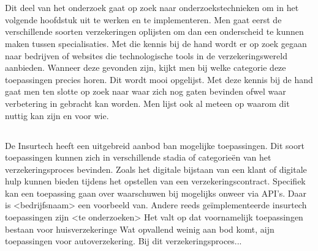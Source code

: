 
\chapter{}
\label{ch:voorbereiding-onderzoek}

\section{}
\label{sec:inleiding}

Dit deel van het onderzoek gaat op zoek naar onderzoekstechnieken om in het volgende hoofdstuk uit te werken en te implementeren.
Men gaat eerst de verschillende soorten verzekeringen oplijsten om dan een onderscheid te kunnen maken tussen specialisaties.
Met die kennis bij de hand wordt er op zoek gegaan naar bedrijven of websites die technologische tools in de verzekeringswereld aanbieden. Wanneer deze gevonden zijn, kijkt men bij welke categorie deze toepassingen precies horen. Dit wordt mooi opgelijst. 
Met deze kennis bij de hand gaat men ten slotte op zoek naar waar zich nog gaten bevinden ofwel waar verbetering in gebracht kan worden. Men lijst ook al meteen op waarom dit nuttig kan zijn en voor wie.

\section{}
\label{sec:bestaande-toepassingen}

De Insurtech heeft een uitgebreid aanbod ban mogelijke toepassingen. Dit soort toepassingen kunnen zich in verschillende stadia of categorieën van het verzekeringsproces bevinden. Zoals het digitale bijstaan van een klant of digitale hulp kunnen bieden tijdens het opstellen van een verzekeringscontract. Specifiek kan een toepassing gaan over waarschuwen bij mogelijks onweer via API’s. Daar is <bedrijfsnaam> een voorbeeld van. Andere reeds geïmplementeerde insurtech toepassingen zijn <te onderzoeken>
Het valt op dat voornamelijk toepassingen bestaan voor huisverzekeringe
Wat opvallend weinig aan bod komt, aijn toepassingen voor autoverzekering. Bij dit verzekeringsproces...
